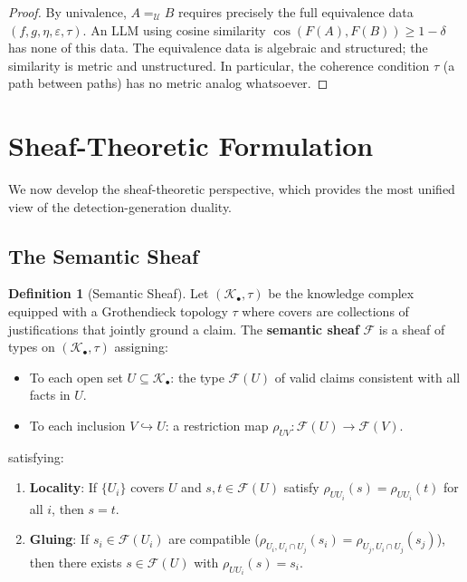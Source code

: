 \documentclass[11pt,a4paper]{article}
\theoremstyle{plain}
\theoremstyle{definition}
\newtheorem{definition}[theorem]{Definition}
\theoremstyle{remark}
\begin{document}
\begin{proof}
By univalence, $A =_{\mathcal{U}} B$ requires precisely the full equivalence data $(f, g, \eta, \varepsilon, \tau)$. An LLM using cosine similarity $\cos(F(A), F(B)) \geq 1 - \delta$ has none of this data. The equivalence data is algebraic and structured; the similarity is metric and unstructured. In particular, the coherence condition $\tau$ (a path between paths) has no metric analog whatsoever.
\end{proof}


\section{Sheaf-Theoretic Formulation}\label{sec:sheaf}

We now develop the sheaf-theoretic perspective, which provides the most unified view of the detection-generation duality.

\subsection{The Semantic Sheaf}

\begin{definition}[Semantic Sheaf]\label{def:semantic-sheaf}
Let $(\mathcal{K}_\bullet, \tau)$ be the knowledge complex equipped with a Grothendieck topology $\tau$ where covers are collections of justifications that jointly ground a claim. The \textbf{semantic sheaf} $\mathcal{F}$ is a sheaf of types on $(\mathcal{K}_\bullet, \tau)$ assigning:
\begin{itemize}[nosep]
  \item To each open set $U \subseteq \mathcal{K}_\bullet$: the type $\mathcal{F}(U)$ of valid claims consistent with all facts in $U$.
  \item To each inclusion $V \hookrightarrow U$: a restriction map $\rho_{UV}\colon \mathcal{F}(U) \to \mathcal{F}(V)$.
\end{itemize}
satisfying:
\begin{enumerate}[nosep]
  \item \textbf{Locality}: If $\{U_i\}$ covers $U$ and $s, t \in \mathcal{F}(U)$ satisfy $\rho_{U U_i}(s) = \rho_{U U_i}(t)$ for all $i$, then $s = t$.
  \item \textbf{Gluing}: If $s_i \in \mathcal{F}(U_i)$ are compatible ($\rho_{U_i, U_i \cap U_j}(s_i) = \rho_{U_j, U_i \cap U_j}(s_j)$), then there exists $s \in \mathcal{F}(U)$ with $\rho_{U U_i}(s) = s_i$.
\end{enumerate}
\end{definition}
\end{document}

